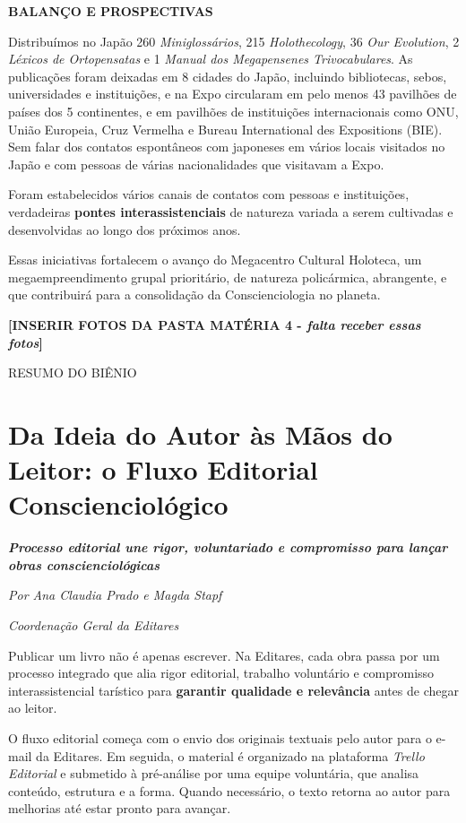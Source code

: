 \documentclass[
]{article}
\begin{document}
\textbf{BALANÇO E PROSPECTIVAS}

Distribuímos no Japão 260 \emph{Miniglossários}, 215 \emph{Holothecology}, 36 \emph{Our Evolution}, 2 \emph{Léxicos de Ortopensatas} e 1 \emph{Manual dos Megapensenes Trivocabulares}. As publicações foram deixadas em 8 cidades do Japão, incluindo bibliotecas, sebos, universidades e instituições, e na Expo circularam em pelo menos 43 pavilhões de países dos 5 continentes, e em pavilhões de instituições internacionais como ONU, União Europeia, Cruz Vermelha e Bureau International des Expositions (BIE). Sem falar dos contatos espontâneos com japoneses em vários locais visitados no Japão e com pessoas de várias nacionalidades que visitavam a Expo.

Foram estabelecidos vários canais de contatos com pessoas e instituições, verdadeiras \textbf{pontes interassistenciais} de natureza variada a serem cultivadas e desenvolvidas ao longo dos próximos anos.

Essas iniciativas fortalecem o avanço do Megacentro Cultural Holoteca, um megaempreendimento grupal prioritário, de natureza policármica, abrangente, e que contribuirá para a consolidação da Conscienciologia no planeta.

\textbf{{[}INSERIR FOTOS DA PASTA MATÉRIA 4 - \emph{falta receber essas fotos}{]}}

RESUMO DO BIÊNIO

\section{Da Ideia do Autor às Mãos do Leitor: o Fluxo Editorial Conscienciológico}\label{da-ideia-do-autor-uxe0s-muxe3os-do-leitor-o-fluxo-editorial-consciencioluxf3gico}

\emph{\textbf{Processo editorial une rigor, voluntariado e compromisso para lançar obras conscienciológicas}}

\emph{Por Ana Claudia Prado e Magda Stapf}

\emph{Coordenação Geral da Editares}

Publicar um livro não é apenas escrever. Na Editares, cada obra passa por um processo integrado que alia rigor editorial, trabalho voluntário e compromisso interassistencial tarístico para \textbf{garantir qualidade e relevância} antes de chegar ao leitor.

O fluxo editorial começa com o envio dos originais textuais pelo autor para o e-mail da Editares. Em seguida, o material é organizado na plataforma \emph{Trello Editorial} e submetido à pré-análise por uma equipe voluntária, que analisa conteúdo, estrutura e a forma. Quando necessário, o texto retorna ao autor para melhorias até estar pronto para avançar.
\end{document}
